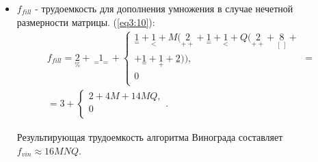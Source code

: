 \begin{itemize}
	\item $f_{fill}$ - трудоемкость для дополнения умножения в случае нечетной размерности матрицы. (\ref{eq3:10}):
	\begin{multline}
		\label{eq3:10}
		f_{fill} = {\underset{\%}{2}} + {\underset{==}{1}} + 
		\begin{cases}
			{\underset{=}{1}} + {\underset{<}{1}} + M({\underset{++}{2}} + {\underset{=}{1}} + {\underset{<}{1}} + Q({\underset{++}{2}} + {\underset{[\ ]}{8}} + \\
			+ {\underset{=}{1}} + {\underset{+}{1}} + {\underset{-}{2}})),\\
			0\\
		\end{cases} = \\
		= 3 + \begin{cases}
			2 + 4M + 14MQ,\\
			0\\
		\end{cases}.
	\end{multline}
	
	Результирующая трудоемкость алгоритма Винограда составляет \newline $f_{vin} \approx 16MNQ$.
\end{itemize}

